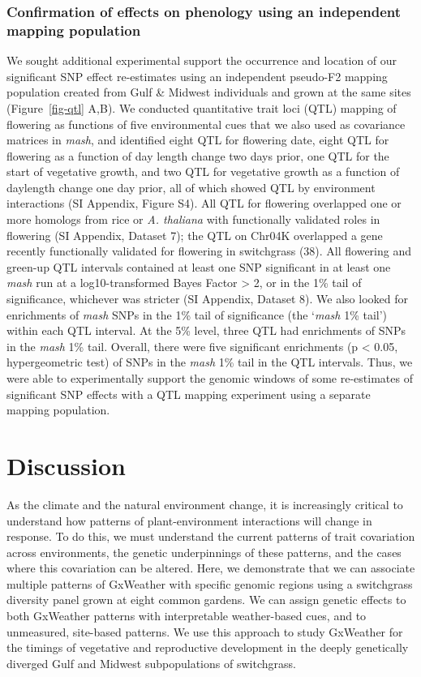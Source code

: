 \documentclass[
  9pt,
  twocolumn,
  twoside]{pnas-new}
\begin{document}
\subsubsection{Confirmation of effects on phenology using an independent
mapping
population}\label{confirmation-of-effects-on-phenology-using-an-independent-mapping-population}

We sought additional experimental support the occurrence and location of
our significant SNP effect re-estimates using an independent pseudo-F2
mapping population created from Gulf \& Midwest individuals and grown at
the same sites (Figure~\ref{fig-qtl} A,B). We conducted quantitative
trait loci (QTL) mapping of flowering as functions of five environmental
cues that we also used as covariance matrices in \emph{mash}, and
identified eight QTL for flowering date, eight QTL for flowering as a
function of day length change two days prior, one QTL for the start of
vegetative growth, and two QTL for vegetative growth as a function of
daylength change one day prior, all of which showed QTL by environment
interactions (SI Appendix, Figure S4). All QTL for flowering overlapped
one or more homologs from rice or \emph{A. thaliana} with functionally
validated roles in flowering (SI Appendix, Dataset 7); the QTL on Chr04K
overlapped a gene recently functionally validated for flowering in
switchgrass (38). All flowering and green-up QTL intervals contained at
least one SNP significant in at least one \emph{mash} run at a
log10-transformed Bayes Factor \textgreater{} 2, or in the 1\% tail of
significance, whichever was stricter (SI Appendix, Dataset 8). We also
looked for enrichments of \emph{mash} SNPs in the 1\% tail of
significance (the `\emph{mash} 1\% tail') within each QTL interval. At
the 5\% level, three QTL had enrichments of SNPs in the \emph{mash} 1\%
tail. Overall, there were five significant enrichments (p \textless{}
0.05, hypergeometric test) of SNPs in the \emph{mash} 1\% tail in the
QTL intervals. Thus, we were able to experimentally support the genomic
windows of some re-estimates of significant SNP effects with a QTL
mapping experiment using a separate mapping population.

\section{Discussion}\label{discussion}

As the climate and the natural environment change, it is increasingly
critical to understand how patterns of plant-environment interactions
will change in response. To do this, we must understand the current
patterns of trait covariation across environments, the genetic
underpinnings of these patterns, and the cases where this covariation
can be altered. Here, we demonstrate that we can associate multiple
patterns of GxWeather with specific genomic regions using a switchgrass
diversity panel grown at eight common gardens. We can assign genetic
effects to both GxWeather patterns with interpretable weather-based
cues, and to unmeasured, site-based patterns. We use this approach to
study GxWeather for the timings of vegetative and reproductive
development in the deeply genetically diverged Gulf and Midwest
subpopulations of switchgrass.
\end{document}
